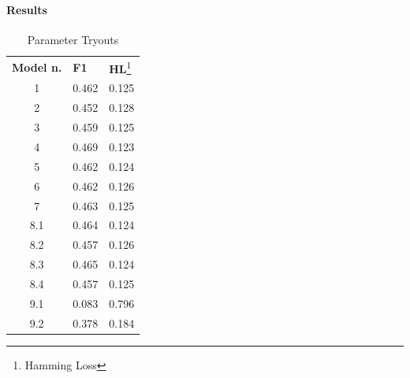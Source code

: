 \begin{frame}
	\frametitle{\secttitle}
	\framesubtitle{Results}
	\begin{table}[]
\centering
\caption{Parameter Tryouts}
\label{my-label}
\begin{tabular}{cll}
\multicolumn{1}{l}{\textbf{Model n.}} & \textbf{F1} & \textbf{HL}\footnote{Hamming Loss} \\
1                                                & 0.462       & 0.125                 \\
2                                                & 0.452       & 0.128                 \\
3                                                & 0.459       & 0.125                 \\
4                                                & 0.469       & 0.123                 \\
5                                                & 0.462       & 0.124                 \\
6                                                & 0.462       & 0.126                 \\
7                                                & 0.463       & 0.125                 \\
8.1                                              & 0.464       & 0.124                 \\
8.2                                              & 0.457       & 0.126                 \\
8.3                                              & 0.465       & 0.124                 \\
8.4                                              & 0.457       & 0.125                 \\
9.1                                              & 0.083       & 0.796                 \\
9.2                                              & 0.378       & 0.184                
\end{tabular}
\end{table}
\end{frame}

